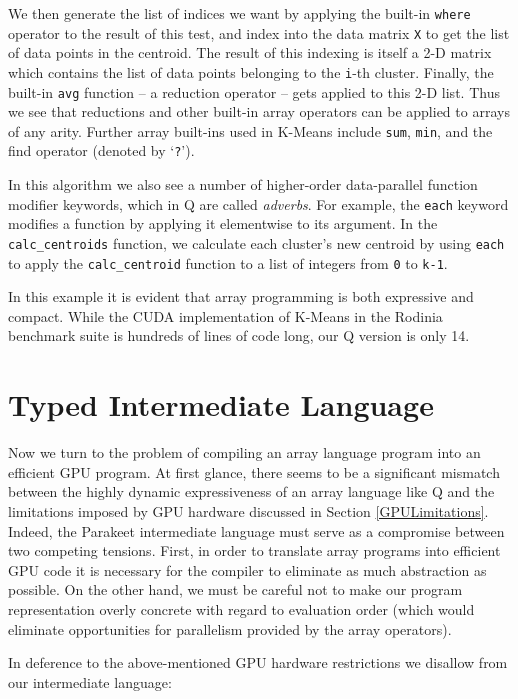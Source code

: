 \documentclass[preprint]{sigplanconf}
\begin{document}
We then generate the list of indices we want by applying the built-in \texttt{where} operator to the result of this test, and index into the data matrix \texttt{X} to get the list of data points in the centroid. The result of this indexing is itself a 2-D matrix which contains the list of data points belonging to the \texttt{i}-th cluster. Finally, the built-in \texttt{avg} function -- a reduction operator -- gets applied to this 2-D list. Thus we see that reductions and other built-in array operators can be applied to arrays of any arity.  Further array built-ins used in K-Means include \texttt{sum}, \texttt{min}, and the find operator (denoted by `\texttt{?}').

In this algorithm we also see a number of higher-order data-parallel function modifier keywords, which in Q are called \emph{adverbs}.  For example, the \texttt{each} keyword modifies a function by applying it elementwise to its argument.  In the \texttt{calc\_centroids} function, we calculate each cluster's new centroid by using \texttt{each} to apply the \texttt{calc\_centroid} function to a list of integers from \texttt{0} to \texttt{k-1}.

In this example it is evident that array programming is both expressive and compact.  While the CUDA implementation of K-Means in the Rodinia benchmark suite is hundreds of lines of code long, our Q version is only 14. 

\section{Typed Intermediate Language}
Now we turn to the problem of compiling an array language program into an efficient GPU program. At first glance, there seems to be a significant mismatch between the highly dynamic expressiveness of an array language like Q and the limitations imposed by GPU hardware discussed in Section \ref{GPULimitations}. Indeed, the Parakeet intermediate language must serve as a compromise between two competing tensions. First, in order to translate array programs into efficient GPU code it is necessary for the compiler to eliminate as much abstraction as possible. On the other hand, we must be careful not to make our program representation overly concrete with regard to evaluation order (which would eliminate opportunities for parallelism provided by the array operators).

In deference to the above-mentioned GPU hardware restrictions we disallow from our intermediate language:
\end{document}
